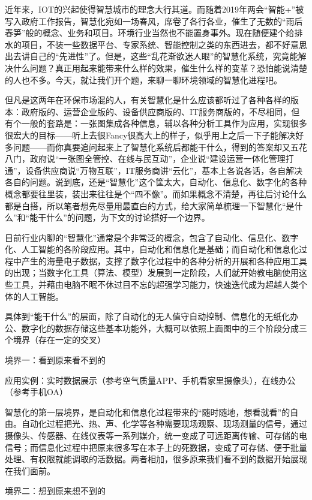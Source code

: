 \documentclass[]{book}
\begin{document}
近年来，IOT的兴起使得智慧城市的理念大行其道。而随着2019年两会``智能+''被写入政府工作报告，智慧化宛如一场春风，席卷了各行各业，催生了无数的``雨后春笋''般的概念、业务和项目。环境行业当然也不能置身事外。现在随便建个给排水的项目，不装一些数据平台、专家系统、智能控制之类的东西进去，都不好意思出去讲自己的``先进性''了。但是，这些``乱花渐欲迷人眼''的智慧化系统，究竟能解决什么问题？真正用起来能带来什么样的效果，催生什么样的变革？恐怕能说清楚的人也不多。今天，就让我们开个题，来聊一聊环境领域的智慧化进程吧。

但凡是这两年在环保市场混的人，有关智慧化是什么应该都听过了各种各样的版本：政府版的、运营企业版的、设备供应商版的、IT服务商版的，不尽相同，但有个一般的套路是：一张图集成各种信息，辅以各种分析工具作为应用，实现很多很宏大的目标------听上去很Fancy很高大上的样子，似乎用上之后一下子能解决好多问题------而你真要追问起来上了智慧化系统后都能干什么，得到的答案却又五花八门，政府说``一张图全管控、在线与民互动''，企业说``建设运营一体化管理打通''，设备供应商说``万物互联''，IT服务商讲``云化''，基本上各说各话，各自解决各自的问题。说到底，还是``智慧化''这个筐太大，自动化、信息化、数字化的各种概念都要往里装，装出来往往是个``四不像''。而如果概念不清楚，再往后讨论什么都是白搭，所以笔者想先尽量用最直白的方式，给大家简单梳理一下智慧化``是什么''和``能干什么''的问题，为下文的讨论搭好一个边界。

目前行业内聊的``智慧化''通常是个非常泛的概念，包含了自动化、信息化、数字化、人工智能的各阶段应用。其中，自动化和信息化是基础；而自动化和信息化过程中产生的海量电子数据，支撑了数字化过程中的各种分析的开展和各种应用工具的出现；当数字化工具（算法、模型）发展到一定阶段，人们就开始教电脑使用这些工具，并藉由电脑不眠不休过目不忘的超强学习能力，快速迭代成为超越人类个体的人工智能。

具体到``能干什么''的层面，除了自动化的无人值守自动控制、信息化的无纸化办公、数字化的数据存储这些基本功能外，大概可以依照上面图中的三个阶段分成三个境界（存在一定的交叉）

境界一：看到原来看不到的

应用实例：实时数据展示（参考空气质量APP、手机看家里摄像头），在线办公（参考手机OA）

智慧化的第一层境界，是自动化和信息化过程带来的``随时随地，想看就看''的自由。自动化过程把光、热、声、化学等各种需要现场观察、现场测量的信号，通过摄像头、传感器、在线仪表等一系列媒介，统一变成了可远距离传输、可存储的电信号；而信息化过程中把原来很多写在本子上的死数据，变成了可存储、便于批量处理、有权限就能调取的活数据。两者相加，很多原来我们看不到的数据开始展现在我们面前。

境界二：想到原来想不到的
\end{document}
